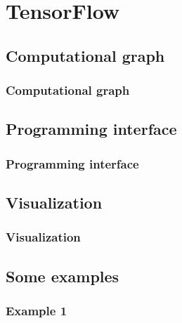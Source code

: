 
\section{TensorFlow}\label{sec:TF}

\subsection{Computational graph}

\begin{frame}
  \MyLogo
  \frametitle{Computational graph}  

\end{frame}

\subsection{Programming interface}

\begin{frame}
  \MyLogo
  \frametitle{Programming interface}  

\end{frame}

\subsection{Visualization}

\begin{frame}
  \MyLogo
  \frametitle{Visualization}  

\end{frame}

\subsection{Some examples}

\begin{frame}
  \MyLogo
  \frametitle{Example 1}  

\end{frame}